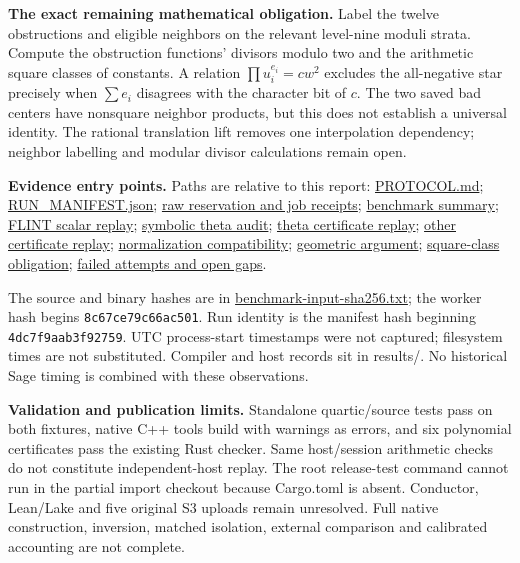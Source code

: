 \documentclass[10pt]{article}
\begin{document}
\newpage
\textbf{The exact remaining mathematical obligation.} Label the twelve
obstructions and eligible neighbors on the relevant level-nine moduli
strata. Compute the obstruction functions' divisors modulo two and the
arithmetic square classes of constants. A relation
$\prod u_i^{e_i}=c w^2$ excludes the all-negative star precisely when
$\sum e_i$ disagrees with the character bit of $c$.
The two saved bad centers have nonsquare neighbor products, but this
does not establish a universal identity. The rational translation lift
removes one interpolation dependency; neighbor labelling and modular
divisor calculations remain open.

\textbf{Evidence entry points.} Paths are relative to this report:
\href{../PROTOCOL.md}{PROTOCOL.md};
\href{../RUN_MANIFEST.json}{RUN\_MANIFEST.json};
\href{../results/pinned-diagnostic/reservation.json}{raw reservation and job receipts};
\href{../results/benchmark-summary.json}{benchmark summary};
\href{../results/source-replay.json}{FLINT scalar replay};
\href{../results/theta-symbolic-audit.json}{symbolic theta audit};
\href{../results/theta-certificate-replay.json}{theta certificate replay};
\href{../results/certificate-replay.json}{other certificate replay};
\href{../results/normalization-family-audit.json}{normalization compatibility};
\href{../GEOMETRIC_CHART_BOUND.md}{geometric argument};
\href{../SQUARE_CLASS_OBLIGATION.md}{square-class obligation};
\href{../results/development-obstructions.json}{failed attempts and open gaps}.

The source and binary hashes are in
\href{../results/benchmark-input-sha256.txt}{benchmark-input-sha256.txt};
the worker hash begins \texttt{8c67ce79c66ac501}. Run identity is the
manifest hash beginning \texttt{4dc7f9aab3f92759}. UTC process-start
timestamps were not captured; filesystem times are not substituted.
Compiler and host records sit in results/. No historical Sage timing is
combined with these observations.

\textbf{Validation and publication limits.} Standalone quartic/source
tests pass on both fixtures, native C++ tools build with warnings as errors,
and six polynomial certificates pass the existing Rust checker. Same
host/session arithmetic checks do not constitute independent-host replay.
The root release-test command cannot run in the partial import checkout
because Cargo.toml is absent. Conductor, Lean/Lake and five original S3
uploads remain unresolved. Full native construction, inversion, matched
isolation, external comparison and calibrated accounting are not complete.
\end{document}
